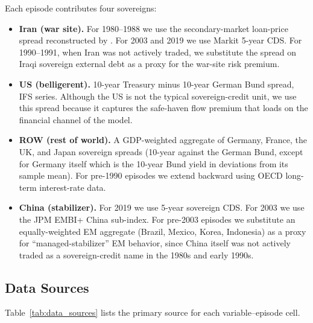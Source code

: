 \documentclass[12pt]{article}
\begin{document}
Each episode contributes four sovereigns:
\begin{itemize}[itemsep=2pt, topsep=2pt]
    \item \textbf{Iran (war site).} For 1980--1988 we use the secondary-market loan-price spread reconstructed by \citet{borensztein2013debt}. For 2003 and 2019 we use Markit 5-year CDS. For 1990--1991, when Iran was not actively traded, we substitute the spread on Iraqi sovereign external debt as a proxy for the war-site risk premium.
    \item \textbf{US (belligerent).} 10-year Treasury minus 10-year German Bund spread, IFS series. Although the US is not the typical sovereign-credit unit, we use this spread because it captures the safe-haven flow premium that loads on the financial channel of the model.
    \item \textbf{ROW (rest of world).} A GDP-weighted aggregate of Germany, France, the UK, and Japan sovereign spreads (10-year against the German Bund, except for Germany itself which is the 10-year Bund yield in deviations from its sample mean). For pre-1990 episodes we extend backward using OECD long-term interest-rate data.
    \item \textbf{China (stabilizer).} For 2019 we use 5-year sovereign CDS. For 2003 we use the JPM EMBI+ China sub-index. For pre-2003 episodes we substitute an equally-weighted EM aggregate (Brazil, Mexico, Korea, Indonesia) as a proxy for ``managed-stabilizer'' EM behavior, since China itself was not actively traded as a sovereign-credit name in the 1980s and early 1990s.
\end{itemize}

\subsection{Data Sources}

Table~\ref{tab:data_sources} lists the primary source for each variable--episode cell.
\end{document}
